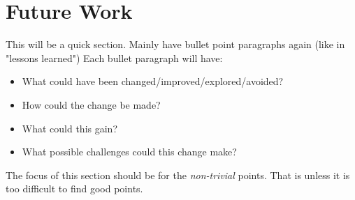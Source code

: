 \section{Future Work}

This will be a quick section.
Mainly have bullet point paragraphs again (like in "lessons learned")
Each bullet paragraph will have:

\begin{itemize}
  \item What could have been changed/improved/explored/avoided?
  \item How could the change be made?
  \item What could this gain?
  \item What possible challenges could this change make?
\end{itemize}

The focus of this section should be for the \textit{non-trivial} points. That is unless it is too difficult to find good points.
